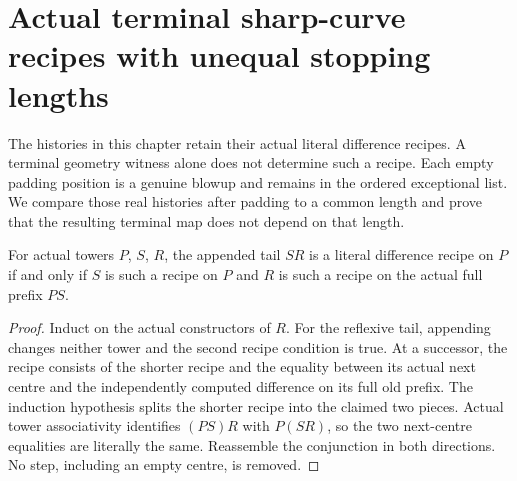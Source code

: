 \section{Actual terminal sharp-curve recipes with unequal stopping lengths}

The histories in this chapter retain their actual literal difference
recipes. A terminal geometry witness alone does not determine such a
recipe. Each empty padding position is a genuine blowup and remains in
the ordered exceptional list. We compare those real histories after
padding to a common length and prove that the resulting terminal map
does not depend on that length.

\begin{theorem}
\label{hir:sharp-actual-difference-recipe-concatenation}
\leanok
For actual towers $P$, $S$, $R$, the appended tail $SR$ is a literal
difference recipe on $P$ if and only if $S$ is such a recipe on $P$ and
$R$ is such a recipe on the actual full prefix $PS$.
\end{theorem}
\begin{proof}
Induct on the actual constructors of $R$. For the reflexive tail,
appending changes neither tower and the second recipe condition is
true. At a successor, the recipe consists of the shorter recipe and
the equality between its actual next centre and the independently
computed difference on its full old prefix. The induction hypothesis
splits the shorter recipe into the claimed two pieces. Actual tower
associativity identifies $(PS)R$ with $P(SR)$, so the two next-centre
equalities are literally the same. Reassemble the conjunction in both
directions. No step, including an empty centre, is removed.
\end{proof}

